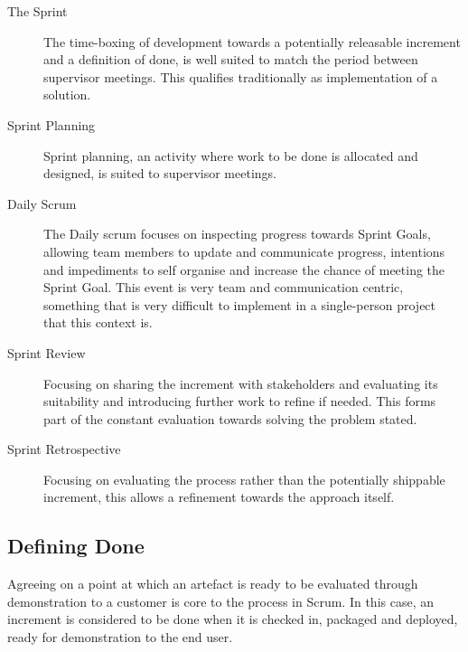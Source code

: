 \begin{description}
	\item[The Sprint] The time-boxing of development towards a potentially releasable increment and a definition of done, is well suited to match the period between supervisor meetings. This qualifies traditionally as implementation of a solution.
	
	\item[Sprint Planning] Sprint planning, an activity where work to be done is allocated and designed, is suited to supervisor meetings. 
	
	\item[Daily Scrum] The Daily scrum focuses on inspecting progress towards Sprint Goals, allowing team members to update and communicate progress, intentions and impediments to self organise and increase the chance of meeting the Sprint Goal. This event is very team and communication centric, something that is very difficult to implement in a single-person project that this context is.
	
	\item[Sprint Review] Focusing on sharing the increment with stakeholders and evaluating its suitability and introducing further work to refine if needed. This forms part of the constant evaluation towards solving the problem stated. 
	
	\item[Sprint Retrospective] Focusing on evaluating the process rather than the potentially shippable increment, this allows a refinement towards the approach itself.
	
\end{description}

\subsection{Defining Done}

Agreeing on a point at which an artefact is ready to be evaluated through demonstration to a customer is core to the process in Scrum. In this case, an increment is considered to be done when it is checked in, packaged and deployed, ready for demonstration to the end user. 